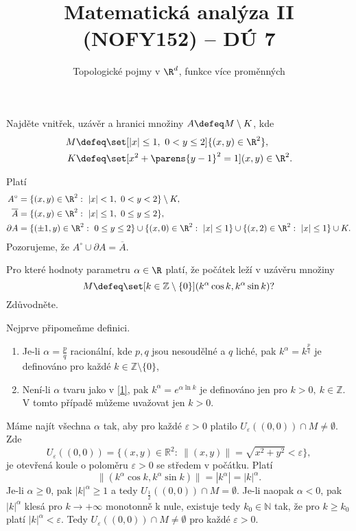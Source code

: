 \documentclass[answers]{exam}
\title{\vspace{-3ex}Matematická analýza II (NOFY152) – DÚ 7}
\author{Topologické pojmy v $\R^d$, funkce více proměnných}
\date{\vspace{-5ex}}
\begin{document}
\maketitle

\begin{questions}	
  \question Najděte vnitřek, uzávěr a hranici množiny $A \defeq M \setminus K$, kde
  \begin{align*}
  M &\defeq \set[|x| \le 1,\ 0 < y \le 2]{(x,y)\in \R^2},
  \\
  K &\defeq \set[x^2 + \parens{y-1}^2 = 1]{(x,y)\in \R^2}.
  \end{align*}
	
  \begin{solution}
		Platí
		\begin{align*}
		A^\circ&= \{(x,y)\in \R^2:\ |x|<1,\ 0<y<2\}\setminus K,\\
		\overline A&= \{(x,y)\in \R^2:\ |x|\le 1,\ 0\le y\le2\},\\
		\partial A&=\{(\pm1,y)\in \R^2:\ 0\le y\le2\}\cup\{(x,0)\in \R^2:\ |x|\le1\}\cup\{(x,2)\in \R^2:\ |x|\le1\}\cup K.
		\end{align*}
		Pozorujeme, že $A^\circ \cup \partial A = \overline{A}$.
  \end{solution}
  
  \question
  Pro kter\'e hodnoty parametru $\alpha\in\R$ plat\'i, \v ze po\v c\'atek le\v z\'i v uz\'av\v eru mno\v ziny
  \begin{equation*}
  	M
  	\defeq
  	\set[k\in\mathbb Z\setminus\{0\}]{(k^\alpha\cos k,k^\alpha\sin k)}?
  \end{equation*}
  Zdůvodněte.
  
  \begin{solution}
		Nejprve p\v ripome\v nme definici. 
		\begin{enumerate}
		 \item \label{1} Je-li $\alpha=\frac{p}{q}$ racion\'aln\'i, kde $p,q$ jsou nesoud\v eln\'e a $q$ lich\'e, pak $k^\alpha=k^{\frac{p}{q}}$ je definov\'ano pro ka\v zd\'e $k\in\mathbb Z\setminus\{0\}$,
		 \item Nen\'i-li $\alpha$ tvaru jako v \ref{1}, pak  $k^{\alpha}=e^{\alpha\ln k}$ je definov\'ano jen pro $k>0,\ k\in\mathbb Z$. V tomto p\v r\'ipad\v e  m\r u\v zeme uva\v zovat jen $k>0$. 
		\end{enumerate}
		
		M\'ame naj\'it v\v sechna $\alpha$ tak, aby pro ka\v zd\'e $\varepsilon>0$ platilo $U_\varepsilon((0,0))\cap M\ne\emptyset$. Zde 
		$$U_{\varepsilon}((0,0))=\{(x,y)\in\mathbb R^2:\ \|(x,y)\|=\sqrt{x^2+y^2}<\varepsilon\},$$
		je otev\v ren\'a koule o polom\v eru $\varepsilon>0$ se st\v redem v po\v c\'atku. Plat\'i 
		$$\|(k^\alpha\cos k,k^\alpha\sin k)\|=|k^\alpha|=|k|^{\alpha}.$$
		Je-li $\alpha\ge0$, pak $|k|^\alpha\ge1$ a tedy $U_\frac{1}{2}((0,0))\cap M=\emptyset$. Je-li naopak $\alpha<0$, pak $|k|^\alpha$ kles\'a pro $k\to+\infty$ monotonn\v e k nule, existuje tedy $k_0\in\mathbb N$ tak, \v ze pro $k\ge k_0$ plat\'i $|k|^\alpha<\varepsilon$. Tedy $U_\varepsilon((0,0))\cap M\ne\emptyset$ pro ka\v zd\'e $\varepsilon>0$.
		

\end{solution}
\end{questions}
\end{document}
